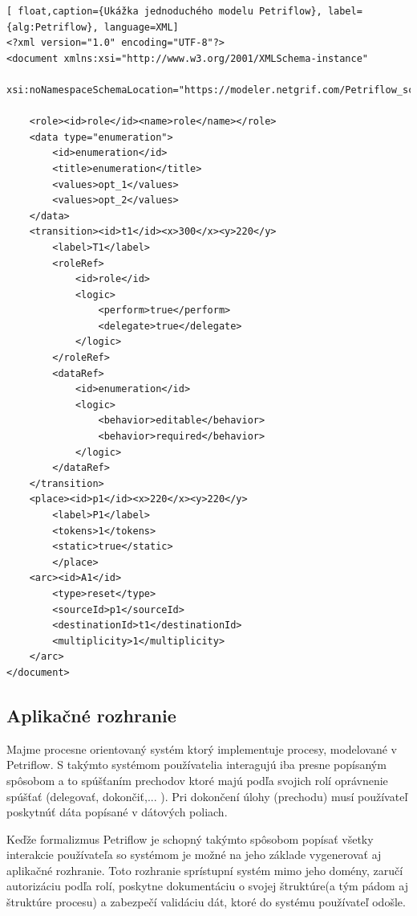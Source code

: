 \begin{lstlisting}[ float,caption={Ukážka jednoduchého modelu Petriflow}, label={alg:Petriflow}, language=XML]
<?xml version="1.0" encoding="UTF-8"?>
<document xmlns:xsi="http://www.w3.org/2001/XMLSchema-instance"
          xsi:noNamespaceSchemaLocation="https://modeler.netgrif.com/Petriflow_schema.xsd">
          
    <role><id>role</id><name>role</name></role>
    <data type="enumeration"> 
        <id>enumeration</id>
        <title>enumeration</title>
        <values>opt_1</values>
        <values>opt_2</values>
    </data>
    <transition><id>t1</id><x>300</x><y>220</y>
        <label>T1</label>
        <roleRef>
            <id>role</id>
            <logic>
                <perform>true</perform>
                <delegate>true</delegate>
            </logic>
        </roleRef>
        <dataRef> 
            <id>enumeration</id>
            <logic>
                <behavior>editable</behavior>
                <behavior>required</behavior>
            </logic>
        </dataRef>
    </transition>
    <place><id>p1</id><x>220</x><y>220</y>
        <label>P1</label>
        <tokens>1</tokens>
        <static>true</static>
        </place>
    <arc><id>A1</id>
        <type>reset</type>
        <sourceId>p1</sourceId>
        <destinationId>t1</destinationId>
        <multiplicity>1</multiplicity>
    </arc>
</document>
\end{lstlisting}






\subsection{Aplikačné rozhranie}

Majme procesne orientovaný systém ktorý implementuje procesy, modelované v Petriflow. S takýmto systémom používatelia interagujú iba presne popísaným spôsobom a to spúšťaním prechodov ktoré majú podľa svojich rolí oprávnenie spúšťať (delegovať, dokončiť,... ). Pri dokončení úlohy (prechodu) musí používateľ poskytnúť dáta popísané v dátových poliach.

Keďže formalizmus Petriflow je schopný takýmto spôsobom popísať všetky interakcie používateľa so systémom je možné na jeho základe vygenerovať aj aplikačné rozhranie. Toto rozhranie sprístupní systém mimo jeho domény, zaručí autorizáciu podľa rolí, poskytne dokumentáciu o svojej štruktúre(a tým pádom aj štruktúre procesu) a zabezpečí validáciu dát, ktoré do systému používateľ odošle.

